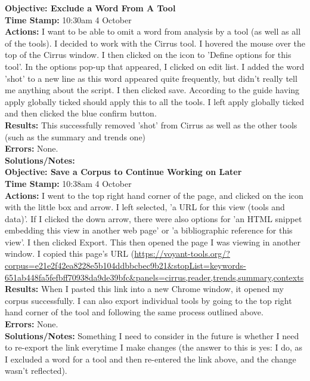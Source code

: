 \documentclass{article}
\begin{document}
\begin{FlushLeft}
\vspace{5mm}
\textbf{Objective: Exclude a Word From A Tool}\\ 
\textbf{Time Stamp:} 10:30am 4 October\\
\textbf{Actions:} I want to be able to omit a word from analysis by a tool (as well as all of the tools). I decided to work with the Cirrus tool. I hovered the mouse over the top of the Cirrus window. I then clicked on the icon to 'Define options for this tool'. In the options pop-up that appeared, I clicked on edit list. I added the word 'shot' to a new line as this word appeared quite frequently, but didn't really tell me anything about the script. I then clicked save. According to the guide having apply globally ticked should apply this to all the tools. I left apply globally ticked and then clicked the blue confirm button.\\
\textbf{Results:} This successfully removed 'shot' from Cirrus as well as the other tools (such as the summary and trends one)\\
\textbf{Errors:} None.\\
\textbf{Solutions/Notes:}\\
\vspace{5mm}
\textbf{Objective: Save a Corpus to Continue Working on Later}\\ 
\textbf{Time Stamp:} 10:38am 4 October\\
\textbf{Actions:} I went to the top right hand corner of the page, and clicked on the icon with the little box and arrow. I left selected, 'a URL for this view (tools and data)'. If I clicked the down arrow, there were also options for 'an HTML snippet embedding this view in another web page' or 'a bibliographic reference for this view'. I then clicked Export. This then opened the page I was viewing in another window. I copied this page's URL (\url{https://voyant-tools.org/?corpus=e21e2f42ea8228e5b104ddbbcbec9b21&stopList=keywords-651ab448fa5fefbff70938da9de39bfc&panels=cirrus,reader,trends,summary,contexts}\\
\textbf{Results:} When I pasted this link into a new Chrome window, it opened my corpus successfully. I can also export individual tools by going to the top right hand corner of the tool and following the same process outlined above.\\
\textbf{Errors:} None.\\
\textbf{Solutions/Notes:} Something I need to consider in the future is whether I need to re-export the link everytime I make changes (the answer to this is yes: I do, as I excluded a word for a tool and then re-entered the link above, and the change wasn't reflected).\\
\vspace{5mm}


\end{FlushLeft}
\end{document}
